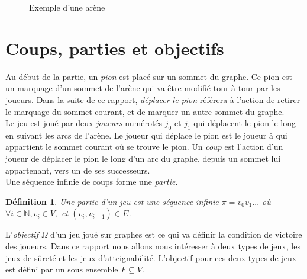 \documentclass[12pt,a4paper,oneside,titlepage]{report}
\newtheorem{defi}{D\'efinition}[section]
\begin{document}
\begin{figure}[h]
\centering
{}
\caption{Exemple d'une arène}
\label{fig:arena}
\end{figure}
\section{Coups, parties et objectifs}
Au début de la partie, un \emph{pion} est placé sur un sommet du graphe. Ce pion est un marquage d'un sommet de l'arène qui va être modifié tour à tour par les joueurs. Dans la suite de ce rapport, \emph{déplacer le pion} référera à l'action de retirer le marquage du sommet courant, et de marquer un autre sommet du graphe.\\
Le jeu est joué par deux \emph{joueurs} numérotés $j_0$ et $j_1$ qui déplacent le pion le long en suivant les arcs de l'arène. Le joueur qui déplace le pion est le joueur à qui appartient le sommet courant où se trouve le pion. Un \emph{coup} est l'action d'un joueur de déplacer le pion le long d'un arc du graphe, depuis un sommet lui appartenant, vers un de ses successeurs.\\
Une séquence infinie de coups forme une \emph{partie}.
\begin{defi}
	Une \emph{partie} d'un jeu est une séquence infinie $\pi=v_0 v_1 ...$ où $\forall i\in \mathbb{N},v_i \in V, $ et $(v_i, v_{i+1})\in E$.
\end{defi}
\noindent L'\emph{objectif} $\Omega$ d'un jeu joué sur graphes est ce qui va définir la condition de victoire des joueurs. Dans ce rapport nous allons nous intéresser à deux types de jeux, les jeux de sûreté et les jeux d'atteignabilité. L'objectif pour ces deux types de jeux est défini par un sous ensemble $F\subseteq V$.
\end{document}
